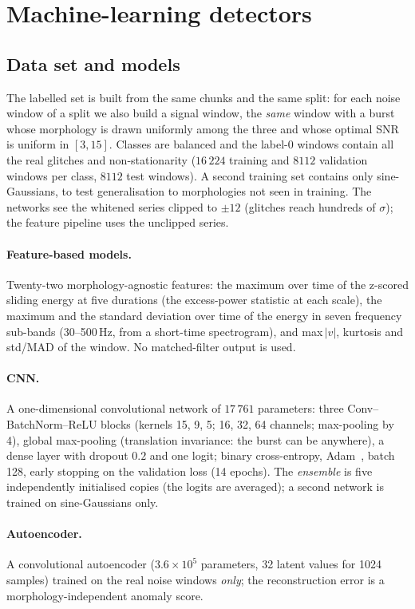 \section{Machine-learning detectors}\label{sec:ml}

\subsection{Data set and models}
The labelled set is built from the same chunks and the same split: for each noise window of a split we also build a signal window, the \emph{same} window with a burst whose morphology is drawn uniformly among the three and whose optimal SNR is uniform in $[3,15]$. Classes are balanced and the label-0 windows contain all the real glitches and non-stationarity
($16\,224$ training and $8112$ validation windows per class, $8112$ test windows). A second training set contains only sine-Gaussians, to test generalisation to morphologies not seen in training. The networks see the whitened series clipped to $\pm12$ (glitches reach hundreds of $\sigma$); the feature pipeline uses the unclipped series.

\paragraph{Feature-based models.} Twenty-two morphology-agnostic features: the maximum over time of the z-scored sliding energy at five durations (the excess-power statistic at each scale), the maximum and the standard deviation over time of the energy in seven frequency sub-bands (30--500\,Hz, from a short-time spectrogram), and max\,$|v|$, kurtosis and std/MAD of the window. No matched-filter output is used.
\paragraph{CNN.} A one-dimensional convolutional network of $17\,761$ parameters: three Conv--BatchNorm--ReLU blocks (kernels 15, 9, 5; 16, 32, 64 channels; max-pooling by 4), global max-pooling (translation invariance: the burst can be anywhere), a dense layer with dropout $0.2$ and one logit; binary cross-entropy, Adam~\cite{Adam}, batch 128, early stopping on the validation loss (14 epochs). The \emph{ensemble} is five independently initialised copies (the logits are averaged); a second network is trained on sine-Gaussians only.
\paragraph{Autoencoder.} A convolutional autoencoder ($3.6\times10^5$ parameters, 32 latent values for 1024 samples) trained on the real noise windows \emph{only}; the reconstruction error is a morphology-independent anomaly score.

